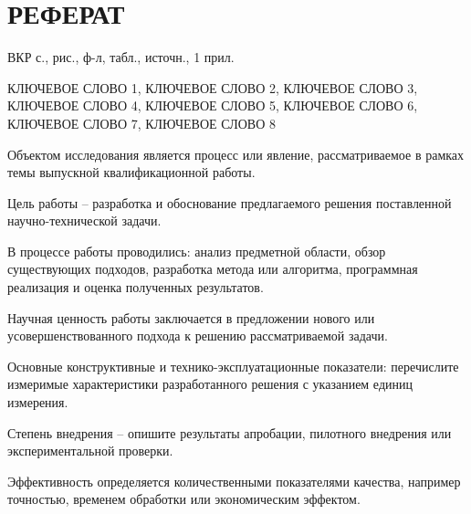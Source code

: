 \newpage
\section*{РЕФЕРАТ}

ВКР \pageref{LastPage} с.,  рис.,  ф-л,  табл., 
источн., 1 прил.

КЛЮЧЕВОЕ СЛОВО 1, КЛЮЧЕВОЕ СЛОВО 2, КЛЮЧЕВОЕ СЛОВО 3, КЛЮЧЕВОЕ СЛОВО 4, КЛЮЧЕВОЕ СЛОВО 5, КЛЮЧЕВОЕ
СЛОВО 6, КЛЮЧЕВОЕ СЛОВО 7, КЛЮЧЕВОЕ СЛОВО 8

Объектом исследования является процесс или явление, рассматриваемое в рамках темы выпускной квалификационной работы.

Цель работы – разработка и обоснование предлагаемого решения поставленной научно-технической задачи.

В процессе работы проводились: анализ предметной области, обзор существующих подходов, разработка метода или алгоритма,
программная реализация и оценка полученных результатов.

Научная ценность работы заключается в предложении нового или усовершенствованного подхода к решению рассматриваемой
задачи.

Основные конструктивные и технико-эксплуатационные показатели: перечислите измеримые характеристики разработанного
решения с указанием единиц измерения.

Степень внедрения – опишите результаты апробации, пилотного внедрения или экспериментальной проверки.

Эффективность определяется количественными показателями качества, например точностью, временем обработки или
экономическим эффектом.
